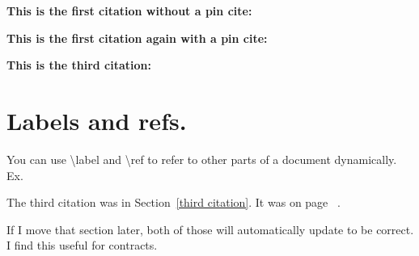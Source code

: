 \documentclass[12pt]{article}
\begin{document}
\textbf{This is the first citation without a pin cite:}\\
\cite{Northland2020} 

\textbf{This is the first citation again with a pin cite: }\\
\cite[411]{Northland2020}

\textbf{This is the third citation:}\\
\cite[275]{Kaigler1997}\label{third citation}

\clearpage

\section{Labels and refs.}
You can use \textbackslash{}label and \textbackslash{}ref to refer to other parts of a document dynamically. Ex.

The third citation was in Section~\ref{third citation}. It was on page ~\pageref{third citation}.

If I move that section later, both of those will automatically update to be correct. I find this useful for contracts.
\end{document}

